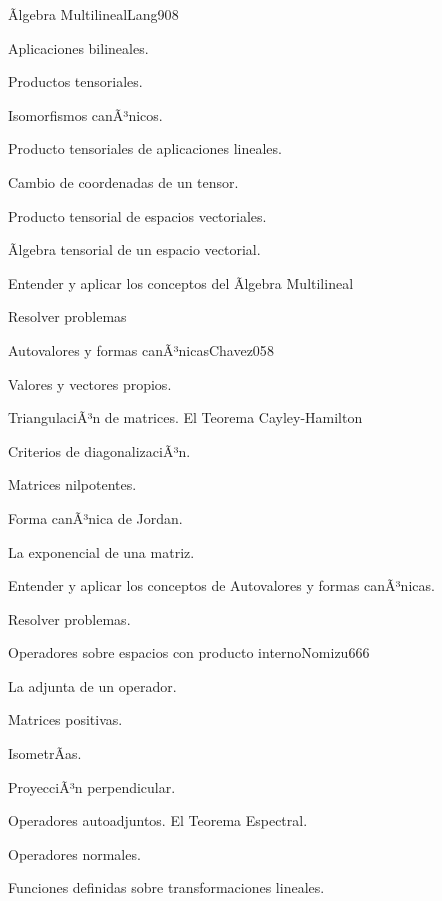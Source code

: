 \begin{syllabus}
\begin{unit}{Ãlgebra Multilineal}{Lang90}{8}
   \begin{topics}
         \item  Aplicaciones bilineales.
	 \item  Productos tensoriales.
         \item  Isomorfismos canÃ³nicos.
	 \item  Producto tensoriales de aplicaciones lineales.
         \item  Cambio de coordenadas de un tensor.
	 \item  Producto tensorial de espacios vectoriales.
         \item  Ãlgebra tensorial de un espacio vectorial.
   \end{topics}

   \begin{unitgoals}
         \item  Entender y aplicar los conceptos del Ãlgebra Multilineal
         \item  Resolver problemas
   \end{unitgoals}
\end{unit}

\begin{unit}{Autovalores y formas canÃ³nicas}{Chavez05}{8}
   \begin{topics}
	\item  Valores y vectores propios.
	\item  TriangulaciÃ³n de matrices. El Teorema Cayley-Hamilton
	\item  Criterios de diagonalizaciÃ³n.
	\item  Matrices nilpotentes.
	\item Forma canÃ³nica de Jordan.
	\item La exponencial de una matriz.
   \end{topics}

   \begin{unitgoals}
         \item  Entender y aplicar los conceptos de Autovalores y formas canÃ³nicas.
         \item  Resolver problemas.
   \end{unitgoals}
\end{unit}

\begin{unit}{Operadores sobre espacios con producto interno}{Nomizu66}{6}
   \begin{topics}
	\item  La adjunta de un operador.
	\item  Matrices positivas.
	\item  IsometrÃ­as.
	\item  ProyecciÃ³n perpendicular.
	\item  Operadores autoadjuntos. El Teorema Espectral.
	\item  Operadores normales.
	\item Funciones definidas sobre transformaciones lineales.
   \end{topics}


\end{unit}
\end{syllabus}
